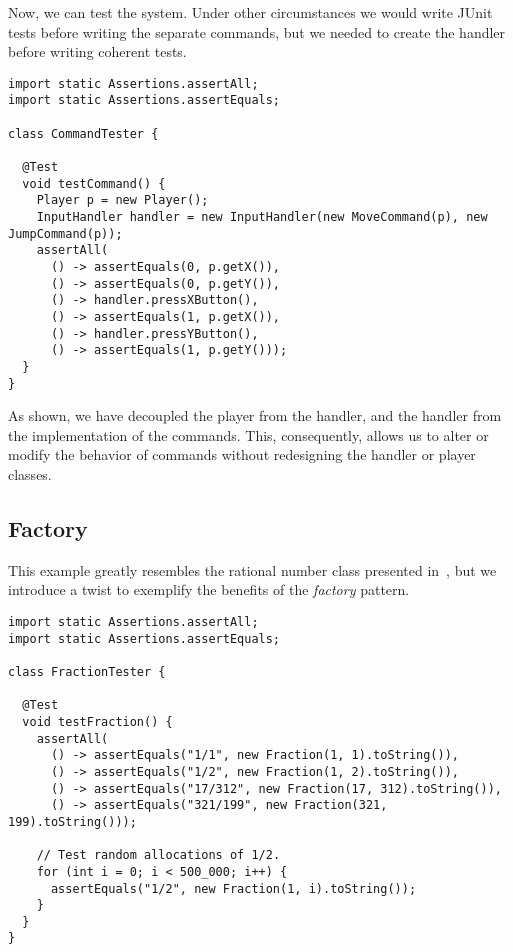 Now, we can test the system.
Under other circumstances we would write JUnit tests before writing the separate commands, but we needed to create the handler before writing coherent tests. 

\begin{lstlisting}[language=MyJava]
import static Assertions.assertAll;
import static Assertions.assertEquals;

class CommandTester {

  @Test
  void testCommand() {
    Player p = new Player();
    InputHandler handler = new InputHandler(new MoveCommand(p), new JumpCommand(p));
    assertAll(
      () -> assertEquals(0, p.getX()),
      () -> assertEquals(0, p.getY()),
      () -> handler.pressXButton(),
      () -> assertEquals(1, p.getX()),
      () -> handler.pressYButton(),
      () -> assertEquals(1, p.getY()));
  }
}
\end{lstlisting}

As shown, we have decoupled the player from the handler, and the handler from the implementation of the commands. 
This, consequently, allows us to alter or modify the behavior of commands without redesigning the handler or player classes.

\subsection{Factory}

This example greatly resembles the rational number class presented in~, but we introduce a twist to exemplify the benefits of the \emph{factory} pattern.

\begin{lstlisting}[language=MyJava]
import static Assertions.assertAll;
import static Assertions.assertEquals;

class FractionTester {

  @Test
  void testFraction() {
    assertAll(
      () -> assertEquals("1/1", new Fraction(1, 1).toString()),
      () -> assertEquals("1/2", new Fraction(1, 2).toString()),
      () -> assertEquals("17/312", new Fraction(17, 312).toString()),
      () -> assertEquals("321/199", new Fraction(321, 199).toString()));

    // Test random allocations of 1/2.
    for (int i = 0; i < 500_000; i++) {
      assertEquals("1/2", new Fraction(1, i).toString());
    }
  } 
}
\end{lstlisting}

